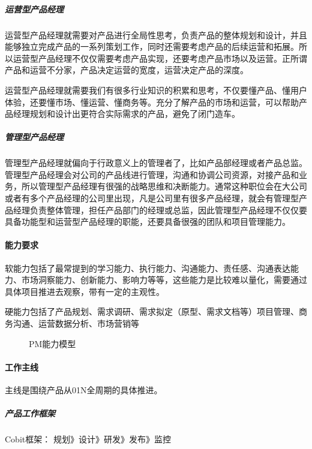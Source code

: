 \documentclass[letterpaper,10pt,english]{sphinxmanual}
\begin{document}
\subparagraph{运营型产品经理}
\label{\detokenize{chapter_introduction/PM:id20}}
运营型产品经理就需要对产品进行全局性思考，负责产品的整体规划和设计，并且能够独立完成产品的一系列策划工作，同时还需要考虑产品的后续运营和拓展。所以运营型产品经理不仅仅需要考虑产品实现，还要考虑产品市场以及运营。正所谓产品和运营不分家，产品决定运营的宽度，运营决定产品的深度。

运营型产品经理就需要我们有很多行业知识的积累和思考，不仅要懂产品、懂用户体验，还要懂市场、懂运营、懂商务等。充分了解产品的市场和运营，可以帮助产品经理规划和设计出更符合实际需求的产品，避免了闭门造车。


\subparagraph{管理型产品经理}
\label{\detokenize{chapter_introduction/PM:id21}}
管理型产品经理就偏向于行政意义上的管理者了，比如产品部经理或者产品总监。管理型产品经理会对公司的产品线进行管理，沟通和协调公司资源，对接产品和业务，所以管理型产品经理有很强的战略思维和决断能力。通常这种职位会在大公司或者有多个产品经理的公司里出现，凡是公司里有很多产品经理，就会有管理型产品经理负责整体管理，担任产品部门的经理或总监，因此管理型产品经理不仅仅要具备功能型和运营型产品经理的职能，还要具备很强的团队和项目管理能力。


\paragraph{能力要求}
\label{\detokenize{chapter_introduction/PM:id22}}
软能力包括了最常提到的学习能力、执行能力、沟通能力、责任感、沟通表达能力、市场洞察能力、创新能力、影响力等等，这些能力是比较难以量化，需要通过具体项目推进去观察，带有一定的主观性。

硬能力包括了产品规划、需求调研、需求拟定（原型、需求文档等）项目管理、商务沟通、运营数据分析、市场营销等

\begin{figure}[H]
\centering
\capstart

\noindent{}
\caption{PM能力模型}\label{\detokenize{chapter_introduction/PM:id68}}\end{figure}


\paragraph{工作主线}
\label{\detokenize{chapter_introduction/PM:id23}}
主线是围绕产品从0\sphinxhyphen{}1\sphinxhyphen{}N全周期的具体推进。


\subparagraph{产品工作框架}
\label{\detokenize{chapter_introduction/PM:id24}}
Cobit框架： 规划\sphinxhyphen{}》设计\sphinxhyphen{}》研发\sphinxhyphen{}》发布\sphinxhyphen{}》监控
\end{document}
